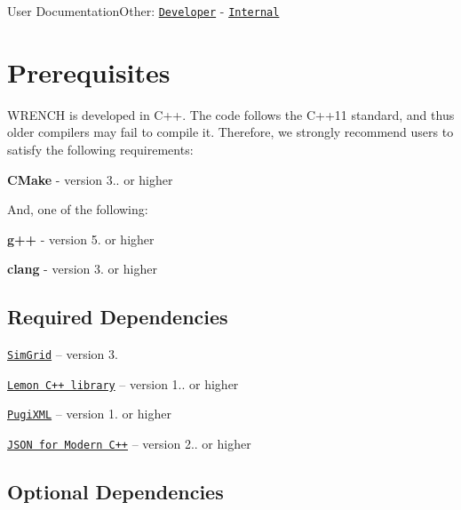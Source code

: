 User DocumentationOther\+: \href{../developer/install.html}{\tt Developer} -\/ \href{../internal/install.html}{\tt Internal}\hypertarget{install_install-prerequisites}{}\section{Prerequisites}\label{install_install-prerequisites}
W\+R\+E\+N\+CH is developed in {\ttfamily C++}. The code follows the C++11 standard, and thus older compilers may fail to compile it. Therefore, we strongly recommend users to satisfy the following requirements\+:


\begin{DoxyItemize}
\item {\bfseries C\+Make} -\/ version 3.. or higher
\end{DoxyItemize}

And, one of the following\+:
\begin{DoxyItemize}
\item {\bfseries g++} -\/ version 5. or higher
\item {\bfseries clang} -\/ version 3. or higher
\end{DoxyItemize}\hypertarget{install_install-prerequisites-dependencies}{}\subsection{Required Dependencies}\label{install_install-prerequisites-dependencies}

\begin{DoxyItemize}
\item \href{https://simgrid.org/}{\tt Sim\+Grid} -- version 3.
\item \href{http://lemon.cs.elte.hu/}{\tt Lemon C++ library} -- version 1.. or higher
\item \href{http://pugixml.org/}{\tt Pugi\+X\+ML} -- version 1. or higher
\item \href{https://github.com/nlohmann/json}{\tt J\+S\+ON for Modern C++} -- version 2.. or higher
\end{DoxyItemize}\hypertarget{install_install-prerequisites-opt-dependencies}{}\subsection{Optional Dependencies}\label{install_install-prerequisites-opt-dependencies}


